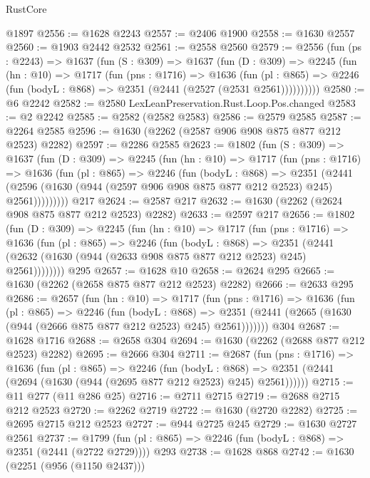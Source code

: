 \begin{lexlean}{RustCore}
\begin{coremodule}
    @1897
@2556 := @1628 @2243
@2557 := @2406 @1900
@2558 := @1630 @2557
@2560 := @1903 @2442 @2532
@2561 := @2558 @2560
@2579 := @2556
    (fun (ps : @2243) =>
    @1637
      (fun (S : @309) =>
      @1637
        (fun (D : @309) =>
        @2245
          (fun (hn : @10) =>
          @1717
            (fun (pns : @1716) =>
            @1636
              (fun (pl : @865) =>
              @2246 (fun (bodyL : @868) => @2351 (@2441 (@2527 (@2531 @2561))))))))))
@2580 := @6 @2242
@2582 := @2580 LexLeanPreservation.Rust.Loop.Pos.changed
@2583 := @2 @2242
@2585 := @2582 (@2582 @2583)
@2586 := @2579 @2585
@2587 := @2264 @2585
@2596 := @1630 (@2262 (@2587 @906 @908 @875 @877 @212 @2523) @2282)
@2597 := @2286 @2585
@2623 := @1802
    (fun (S : @309) =>
    @1637
      (fun (D : @309) =>
      @2245
        (fun (hn : @10) =>
        @1717
          (fun (pns : @1716) =>
          @1636
            (fun (pl : @865) =>
            @2246
              (fun (bodyL : @868) =>
              @2351
                (@2441
                  (@2596 (@1630 (@944 (@2597 @906 @908 @875 @877 @212 @2523) @245) @2561)))))))))
    @217
@2624 := @2587 @217
@2632 := @1630 (@2262 (@2624 @908 @875 @877 @212 @2523) @2282)
@2633 := @2597 @217
@2656 := @1802
    (fun (D : @309) =>
    @2245
      (fun (hn : @10) =>
      @1717
        (fun (pns : @1716) =>
        @1636
          (fun (pl : @865) =>
          @2246
            (fun (bodyL : @868) =>
            @2351 (@2441 (@2632 (@1630 (@944 (@2633 @908 @875 @877 @212 @2523) @245) @2561))))))))
    @295
@2657 := @1628 @10
@2658 := @2624 @295
@2665 := @1630 (@2262 (@2658 @875 @877 @212 @2523) @2282)
@2666 := @2633 @295
@2686 := @2657
    (fun (hn : @10) =>
    @1717
      (fun (pns : @1716) =>
      @1636
        (fun (pl : @865) =>
        @2246
          (fun (bodyL : @868) =>
          @2351 (@2441 (@2665 (@1630 (@944 (@2666 @875 @877 @212 @2523) @245) @2561)))))))
    @304
@2687 := @1628 @1716
@2688 := @2658 @304
@2694 := @1630 (@2262 (@2688 @877 @212 @2523) @2282)
@2695 := @2666 @304
@2711 := @2687
    (fun (pns : @1716) =>
    @1636
      (fun (pl : @865) =>
      @2246
        (fun (bodyL : @868) =>
        @2351 (@2441 (@2694 (@1630 (@944 (@2695 @877 @212 @2523) @245) @2561))))))
@2715 := @11 @277 (@11 @286 @25)
@2716 := @2711 @2715
@2719 := @2688 @2715 @212 @2523
@2720 := @2262 @2719
@2722 := @1630 (@2720 @2282)
@2725 := @2695 @2715 @212 @2523
@2727 := @944 @2725 @245
@2729 := @1630 @2727 @2561
@2737 := @1799 (fun (pl : @865) => @2246 (fun (bodyL : @868) => @2351 (@2441 (@2722 @2729)))) @293
@2738 := @1628 @868
@2742 := @1630 (@2251 (@956 (@1150 @2437)))

\end{coremodule}
\end{lexlean}
